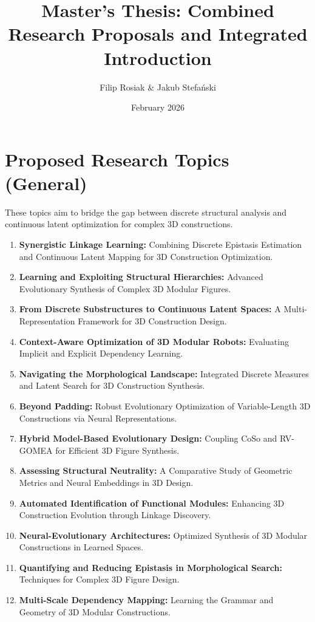 \documentclass[12pt,a4paper]{article}
\title{Master's Thesis: Combined Research Proposals and Integrated Introduction}
\author{Filip Rosiak \& Jakub Stefański}
\date{February 2026}
\begin{document}
\maketitle

\section{Proposed Research Topics (General)}
These topics aim to bridge the gap between discrete structural analysis and continuous latent optimization for complex 3D constructions.

\begin{enumerate}
    \item \textbf{Synergistic Linkage Learning:} Combining Discrete Epistasis Estimation and Continuous Latent Mapping for 3D Construction Optimization.
    \item \textbf{Learning and Exploiting Structural Hierarchies:} Advanced Evolutionary Synthesis of Complex 3D Modular Figures.
    \item \textbf{From Discrete Substructures to Continuous Latent Spaces:} A Multi-Representation Framework for 3D Construction Design.
    \item \textbf{Context-Aware Optimization of 3D Modular Robots:} Evaluating Implicit and Explicit Dependency Learning.
    \item \textbf{Navigating the Morphological Landscape:} Integrated Discrete Measures and Latent Search for 3D Construction Synthesis.
    \item \textbf{Beyond Padding:} Robust Evolutionary Optimization of Variable-Length 3D Constructions via Neural Representations.
    \item \textbf{Hybrid Model-Based Evolutionary Design:} Coupling CoSo and RV-GOMEA for Efficient 3D Figure Synthesis.
    \item \textbf{Assessing Structural Neutrality:} A Comparative Study of Geometric Metrics and Neural Embeddings in 3D Design.
    \item \textbf{Automated Identification of Functional Modules:} Enhancing 3D Construction Evolution through Linkage Discovery.
    \item \textbf{Neural-Evolutionary Architectures:} Optimized Synthesis of 3D Modular Constructions in Learned Spaces.
    \item \textbf{Quantifying and Reducing Epistasis in Morphological Search:} Techniques for Complex 3D Figure Design.
    \item \textbf{Multi-Scale Dependency Mapping:} Learning the Grammar and Geometry of 3D Modular Constructions.

\end{enumerate}
\end{document}
